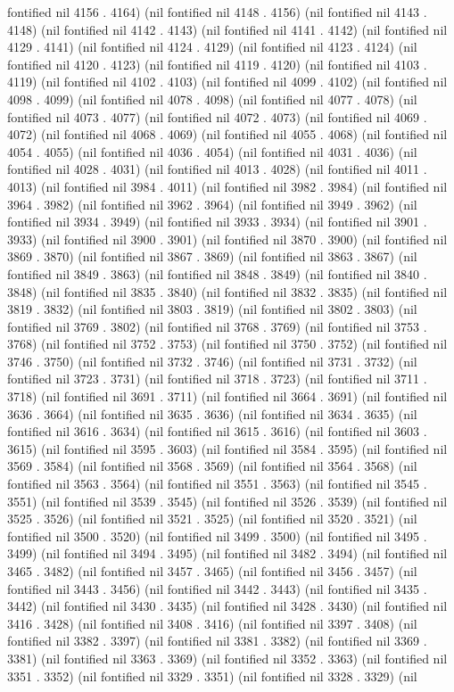 fontified nil 4156 . 4164) (nil fontified nil 4148 . 4156) (nil fontified nil 4143 . 4148) (nil fontified nil 4142 . 4143) (nil fontified nil 4141 . 4142) (nil fontified nil 4129 . 4141) (nil fontified nil 4124 . 4129) (nil fontified nil 4123 . 4124) (nil fontified nil 4120 . 4123) (nil fontified nil 4119 . 4120) (nil fontified nil 4103 . 4119) (nil fontified nil 4102 . 4103) (nil fontified nil 4099 . 4102) (nil fontified nil 4098 . 4099) (nil fontified nil 4078 . 4098) (nil fontified nil 4077 . 4078) (nil fontified nil 4073 . 4077) (nil fontified nil 4072 . 4073) (nil fontified nil 4069 . 4072) (nil fontified nil 4068 . 4069) (nil fontified nil 4055 . 4068) (nil fontified nil 4054 . 4055) (nil fontified nil 4036 . 4054) (nil fontified nil 4031 . 4036) (nil fontified nil 4028 . 4031) (nil fontified nil 4013 . 4028) (nil fontified nil 4011 . 4013) (nil fontified nil 3984 . 4011) (nil fontified nil 3982 . 3984) (nil fontified nil 3964 . 3982) (nil fontified nil 3962 . 3964) (nil fontified nil 3949 . 3962) (nil fontified nil 3934 . 3949) (nil fontified nil 3933 . 3934) (nil fontified nil 3901 . 3933) (nil fontified nil 3900 . 3901) (nil fontified nil 3870 . 3900) (nil fontified nil 3869 . 3870) (nil fontified nil 3867 . 3869) (nil fontified nil 3863 . 3867) (nil fontified nil 3849 . 3863) (nil fontified nil 3848 . 3849) (nil fontified nil 3840 . 3848) (nil fontified nil 3835 . 3840) (nil fontified nil 3832 . 3835) (nil fontified nil 3819 . 3832) (nil fontified nil 3803 . 3819) (nil fontified nil 3802 . 3803) (nil fontified nil 3769 . 3802) (nil fontified nil 3768 . 3769) (nil fontified nil 3753 . 3768) (nil fontified nil 3752 . 3753) (nil fontified nil 3750 . 3752) (nil fontified nil 3746 . 3750) (nil fontified nil 3732 . 3746) (nil fontified nil 3731 . 3732) (nil fontified nil 3723 . 3731) (nil fontified nil 3718 . 3723) (nil fontified nil 3711 . 3718) (nil fontified nil 3691 . 3711) (nil fontified nil 3664 . 3691) (nil fontified nil 3636 . 3664) (nil fontified nil 3635 . 3636) (nil fontified nil 3634 . 3635) (nil fontified nil 3616 . 3634) (nil fontified nil 3615 . 3616) (nil fontified nil 3603 . 3615) (nil fontified nil 3595 . 3603) (nil fontified nil 3584 . 3595) (nil fontified nil 3569 . 3584) (nil fontified nil 3568 . 3569) (nil fontified nil 3564 . 3568) (nil fontified nil 3563 . 3564) (nil fontified nil 3551 . 3563) (nil fontified nil 3545 . 3551) (nil fontified nil 3539 . 3545) (nil fontified nil 3526 . 3539) (nil fontified nil 3525 . 3526) (nil fontified nil 3521 . 3525) (nil fontified nil 3520 . 3521) (nil fontified nil 3500 . 3520) (nil fontified nil 3499 . 3500) (nil fontified nil 3495 . 3499) (nil fontified nil 3494 . 3495) (nil fontified nil 3482 . 3494) (nil fontified nil 3465 . 3482) (nil fontified nil 3457 . 3465) (nil fontified nil 3456 . 3457) (nil fontified nil 3443 . 3456) (nil fontified nil 3442 . 3443) (nil fontified nil 3435 . 3442) (nil fontified nil 3430 . 3435) (nil fontified nil 3428 . 3430) (nil fontified nil 3416 . 3428) (nil fontified nil 3408 . 3416) (nil fontified nil 3397 . 3408) (nil fontified nil 3382 . 3397) (nil fontified nil 3381 . 3382) (nil fontified nil 3369 . 3381) (nil fontified nil 3363 . 3369) (nil fontified nil 3352 . 3363) (nil fontified nil 3351 . 3352) (nil fontified nil 3329 . 3351) (nil fontified nil 3328 . 3329) (nil 